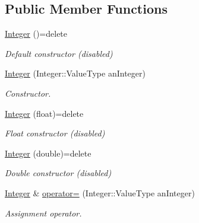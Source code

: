 \subsection*{Public Member Functions}
\begin{DoxyCompactItemize}
\item 
\mbox{\label{classlibrary_1_1core_1_1types_1_1_integer_a6483b1c4e13e5ed6af5e7a58347efead}} 
\hyperlink{classlibrary_1_1core_1_1types_1_1_integer_a6483b1c4e13e5ed6af5e7a58347efead}{Integer} ()=delete
\begin{DoxyCompactList}\small\item\em Default constructor (disabled) \end{DoxyCompactList}\item 
\hyperlink{classlibrary_1_1core_1_1types_1_1_integer_ac282b8e24c1d1a43e578c5be3c70ea27}{Integer} (Integer\+::\+Value\+Type an\+Integer)
\begin{DoxyCompactList}\small\item\em Constructor. \end{DoxyCompactList}\item 
\mbox{\label{classlibrary_1_1core_1_1types_1_1_integer_af3bcebe374c4b7b4329ed0a7fae04abd}} 
\hyperlink{classlibrary_1_1core_1_1types_1_1_integer_af3bcebe374c4b7b4329ed0a7fae04abd}{Integer} (float)=delete
\begin{DoxyCompactList}\small\item\em Float constructor (disabled) \end{DoxyCompactList}\item 
\mbox{\label{classlibrary_1_1core_1_1types_1_1_integer_ab0d94d5cfc78f38f1598679015f4ab61}} 
\hyperlink{classlibrary_1_1core_1_1types_1_1_integer_ab0d94d5cfc78f38f1598679015f4ab61}{Integer} (double)=delete
\begin{DoxyCompactList}\small\item\em Double constructor (disabled) \end{DoxyCompactList}\item 
\hyperlink{classlibrary_1_1core_1_1types_1_1_integer}{Integer} \& \hyperlink{classlibrary_1_1core_1_1types_1_1_integer_ab77cae94a9e6d4a405a555dd55763ea2}{operator=} (Integer\+::\+Value\+Type an\+Integer)
\begin{DoxyCompactList}\small\item\em Assignment operator. \end{DoxyCompactList}\item 

\end{DoxyCompactItemize}
